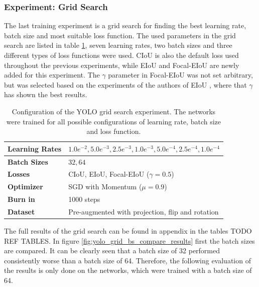 \subsubsection{Experiment: Grid Search}

The last training experiment is a grid search for finding the best learning rate, batch size and most suitable loss function.
The used parameters in the grid search are listed in table \ref{tab:yolo_grid_search_config}, seven learning rates, two batch sizes and three different types of loss functions were used.
\ac{CIoU} is also the default loss used throughout the previous experiments, while \ac{EIoU} and Focal-\ac{EIoU} are newly added for this experiment.
The $\gamma$ parameter in Focal-\ac{EIoU} was not set arbitrary, but was selected based on the experiments of the authors of \ac{EIoU} \cite{eiou}, where that $\gamma$ has shown the best results.


\begin{table}[H]
\footnotesize
\begin{center}
\begin{tabular}{|l|l|}

\hline
\textbf{Learning Rates} & $1.0e^{-2}, 5.0e^{-3}, 2.5e^{-3}, 1.0e^{-3}, 5.0e^{-4}, 2.5e^{-4}, 1.0e^{-4}$ \\
\hline
\textbf{Batch Sizes} & $32, 64$\\
\hline
\textbf{Losses} & CIoU, EIoU, Focal-EIoU ($\gamma = 0.5$) \\
\hline
\textbf{Optimizer} & SGD with Momentum ($\mu = 0.9$) \\
\hline
\textbf{Burn in} & 1000 steps \\
\hline
\textbf{Dataset} & Pre-augmented with projection, flip and rotation \\
\hline

\end{tabular}
\caption{Configuration of the YOLO grid search experiment. The networks were trained for all possible configurations of learning rate, batch size and loss function.}
\label{tab:yolo_grid_search_config}
\end{center}
\end{table}

The full results of the grid search can be found in appendix in the tables TODO REF TABLES.
In figure \ref{fig:yolo_grid_bs_compare_results} first the batch sizes are compared.
It can be clearly seen that a batch size of 32 performed consistently worse than a batch size of 64.
Therefore, the following evaluation of the results is only done on the networks, which were trained with a batch size of 64.

